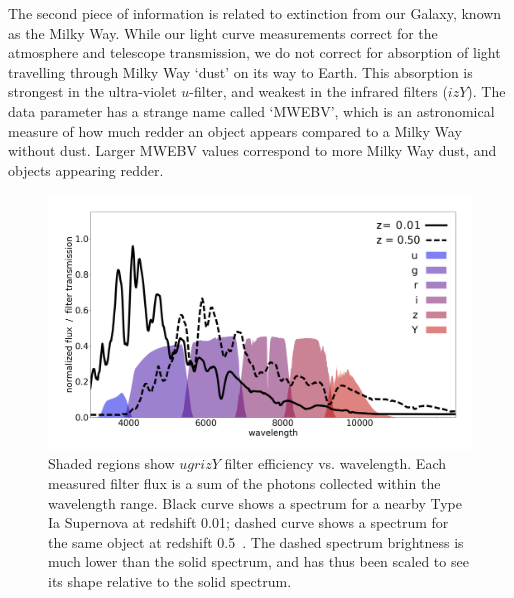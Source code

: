 The second piece of information is related to extinction from our Galaxy, 
known as the Milky Way. While our light curve measurements correct
for the atmosphere and telescope transmission, we do not correct for
absorption of light travelling through Milky Way `dust' on its way to Earth.
This absorption is strongest in the ultra-violet $u$-filter, and weakest
in the infrared filters ($izY$). 
The data parameter has a strange name called `MWEBV', which is an 
astronomical measure of how much redder an object appears compared
to a Milky Way without dust. 
Larger MWEBV values correspond to more Milky Way dust,
and objects appearing redder.


\begin{figure}
\includegraphics[width=\textwidth]{figures/spec_filters.png}
\caption{Shaded regions show $ugrizY$ filter efficiency vs. wavelength.
Each measured filter flux is a sum of the photons collected within the wavelength range.
Black curve shows a spectrum for a nearby Type Ia Supernova at redshift 0.01;
dashed curve shows a spectrum for the same object at redshift 0.5~.
The dashed spectrum {brightness is much lower than the solid spectrum, and has thus been scaled} to see its shape relative
to the solid spectrum.}
\label{fig:filters}
\end{figure}





